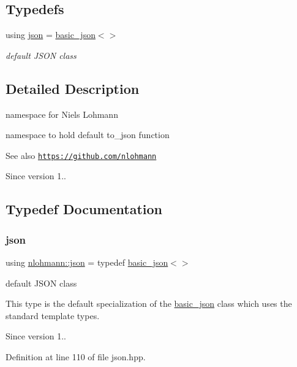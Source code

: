 \subsection*{Typedefs}
\begin{DoxyCompactItemize}
\item 
using \hyperlink{namespacenlohmann_a2bfd99e845a2e5cd90aeaf1b1431f474}{json} = \hyperlink{classnlohmann_1_1basic__json}{basic\+\_\+json}$<$$>$
\begin{DoxyCompactList}\small\item\em default J\+S\+ON class \end{DoxyCompactList}\end{DoxyCompactItemize}


\subsection{Detailed Description}
namespace for Niels Lohmann 

namespace to hold default {\ttfamily to\+\_\+json} function

\begin{DoxySeeAlso}{See also}
\href{https://github.com/nlohmann}{\tt https\+://github.\+com/nlohmann} 
\end{DoxySeeAlso}
\begin{DoxySince}{Since}
version 1.. 
\end{DoxySince}


\subsection{Typedef Documentation}
\mbox{\label{namespacenlohmann_a2bfd99e845a2e5cd90aeaf1b1431f474}} 
\subsubsection{\texorpdfstring{json}{json}}
{\footnotesize\ttfamily using \hyperlink{namespacenlohmann_a2bfd99e845a2e5cd90aeaf1b1431f474}{nlohmann\+::json} = typedef \hyperlink{classnlohmann_1_1basic__json}{basic\+\_\+json}$<$$>$}



default J\+S\+ON class 

This type is the default specialization of the \hyperlink{classnlohmann_1_1basic__json}{basic\+\_\+json} class which uses the standard template types.

\begin{DoxySince}{Since}
version 1.. 
\end{DoxySince}


Definition at line 110 of file json.\+hpp.

